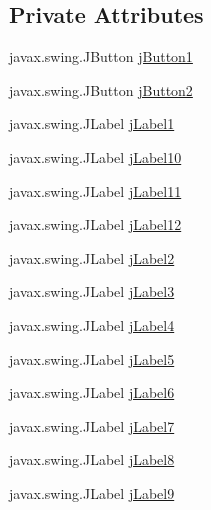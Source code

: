 \subsection*{Private Attributes}
\begin{DoxyCompactItemize}
\item 
javax.\+swing.\+J\+Button \mbox{\hyperlink{class_interfaz_package_1_1_informacion_cliente_aa7c801b9c192b73cd1b5a0d73a3a7de3}{j\+Button1}}
\item 
javax.\+swing.\+J\+Button \mbox{\hyperlink{class_interfaz_package_1_1_informacion_cliente_a18ab6870a03adb8b530c00f93ff9656b}{j\+Button2}}
\item 
javax.\+swing.\+J\+Label \mbox{\hyperlink{class_interfaz_package_1_1_informacion_cliente_a76d63040cd29ebdaf61bb51a1f748393}{j\+Label1}}
\item 
javax.\+swing.\+J\+Label \mbox{\hyperlink{class_interfaz_package_1_1_informacion_cliente_af5593b23fec083a2c1f0cfccfb17b2ad}{j\+Label10}}
\item 
javax.\+swing.\+J\+Label \mbox{\hyperlink{class_interfaz_package_1_1_informacion_cliente_a31fbf3562a8a9f5df8d2b5b19f2f9f76}{j\+Label11}}
\item 
javax.\+swing.\+J\+Label \mbox{\hyperlink{class_interfaz_package_1_1_informacion_cliente_ae99ca6a6dc9eb57f924b11c625ab6209}{j\+Label12}}
\item 
javax.\+swing.\+J\+Label \mbox{\hyperlink{class_interfaz_package_1_1_informacion_cliente_a1ff1b1422342b4b51d17fb166ec625ff}{j\+Label2}}
\item 
javax.\+swing.\+J\+Label \mbox{\hyperlink{class_interfaz_package_1_1_informacion_cliente_affc4d391ce9a4a138bb4ea1fc2fc23ec}{j\+Label3}}
\item 
javax.\+swing.\+J\+Label \mbox{\hyperlink{class_interfaz_package_1_1_informacion_cliente_aa0124c463f35b5a5caaf6987b4329799}{j\+Label4}}
\item 
javax.\+swing.\+J\+Label \mbox{\hyperlink{class_interfaz_package_1_1_informacion_cliente_a12ceb5a1b4c467dfa98d98325d8ef848}{j\+Label5}}
\item 
javax.\+swing.\+J\+Label \mbox{\hyperlink{class_interfaz_package_1_1_informacion_cliente_a821aa89fbcb7dfaebf2fadaa9afe79e6}{j\+Label6}}
\item 
javax.\+swing.\+J\+Label \mbox{\hyperlink{class_interfaz_package_1_1_informacion_cliente_a43ed96cf07f28a71b91c6825e13023c3}{j\+Label7}}
\item 
javax.\+swing.\+J\+Label \mbox{\hyperlink{class_interfaz_package_1_1_informacion_cliente_acafa312ca1d5f92c4d3f969e1879289b}{j\+Label8}}
\item 
javax.\+swing.\+J\+Label \mbox{\hyperlink{class_interfaz_package_1_1_informacion_cliente_a03808e144608db738a13ec9eaa6d5559}{j\+Label9}}
\end{DoxyCompactItemize}


